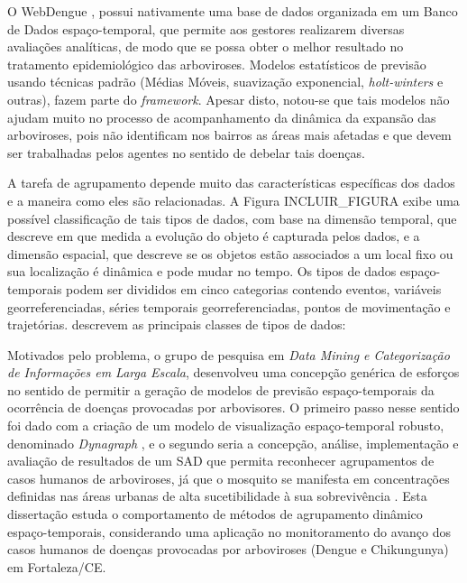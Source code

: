 O WebDengue \cite{webdengue2011}, possui nativamente uma base de dados organizada em um Banco de Dados espaço-temporal, que permite aos gestores realizarem diversas avaliações analíticas, de modo que se possa obter o melhor resultado no tratamento epidemiológico das arboviroses. Modelos estatísticos de previsão usando técnicas padrão (Médias Móveis, suavização exponencial, \emph{holt-winters} e outras), fazem parte do \emph{framework}. Apesar disto, notou-se que tais modelos não ajudam muito no processo de acompanhamento da dinâmica da expansão das arboviroses, pois não identificam nos bairros as áreas mais afetadas e que devem ser trabalhadas pelos agentes no sentido de debelar tais doenças.

A tarefa de agrupamento depende muito das características específicas dos dados e a maneira como eles são relacionadas. A Figura INCLUIR_FIGURA exibe uma possível classificação de tais tipos de dados, com base na dimensão temporal, que descreve em que medida a evolução do objeto é capturada pelos dados, e a dimensão espacial, que descreve se os objetos estão associados a um local fixo ou sua localização é dinâmica e pode mudar no tempo.
 Os tipos de dados espaço-temporais podem ser divididos em cinco categorias contendo eventos, variáveis georreferenciadas, séries temporais georreferenciadas, pontos de movimentação e trajetórias.  descrevem as principais classes de tipos de dados:


Motivados pelo problema, o grupo de pesquisa em \textit{Data Mining e Categorização de Informações em Larga Escala}, desenvolveu uma concepção genérica de esforços no sentido de permitir a geração de modelos de previsão espaço-temporais da ocorrência de doenças provocadas por arbovisores. O primeiro passo nesse sentido foi dado com a criação de um modelo de visualização espaço-temporal robusto, denominado \emph{Dynagraph} \cite{dynagraph}, e o segundo seria a concepção, análise, implementação e avaliação de resultados de um \acrfull{SAD} que permita reconhecer agrupamentos de casos humanos de arboviroses, já que o mosquito se manifesta em concentrações definidas nas áreas urbanas de alta sucetibilidade à sua sobrevivência \cite{comportamentoDengue}.
Esta dissertação estuda o comportamento de métodos de agrupamento dinâmico espaço-temporais, considerando uma aplicação no monitoramento do avanço dos casos humanos de doenças provocadas por arboviroses (Dengue e Chikungunya) em Fortaleza/CE.

